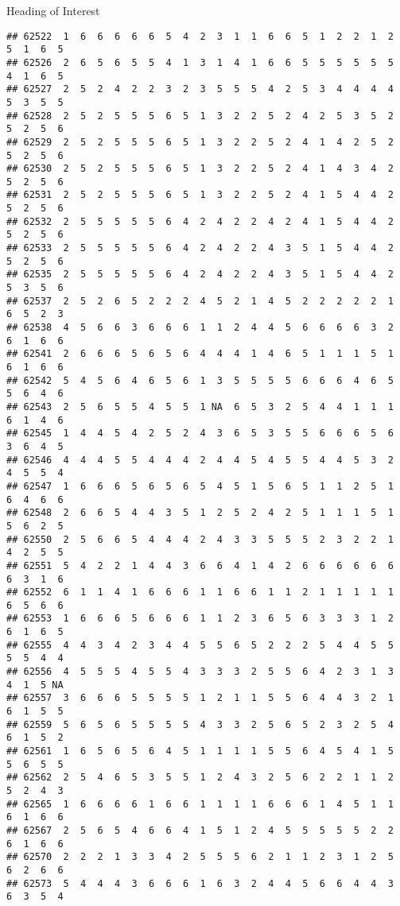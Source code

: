 \documentclass[
  ignorenonframetext,
]{beamer}
\begin{document}
\begin{frame}[fragile]{Heading of Interest}
\begin{verbatim}
## 62522  1  6  6  6  6  6  5  4  2  3  1  1  6  6  5  1  2  2  1  2  5  1  6  5
## 62526  2  6  5  6  5  5  4  1  3  1  4  1  6  6  5  5  5  5  5  5  4  1  6  5
## 62527  2  5  2  4  2  2  3  2  3  5  5  5  4  2  5  3  4  4  4  4  5  3  5  5
## 62528  2  5  2  5  5  5  6  5  1  3  2  2  5  2  4  2  5  3  5  2  5  2  5  6
## 62529  2  5  2  5  5  5  6  5  1  3  2  2  5  2  4  1  4  2  5  2  5  2  5  6
## 62530  2  5  2  5  5  5  6  5  1  3  2  2  5  2  4  1  4  3  4  2  5  2  5  6
## 62531  2  5  2  5  5  5  6  5  1  3  2  2  5  2  4  1  5  4  4  2  5  2  5  6
## 62532  2  5  5  5  5  5  6  4  2  4  2  2  4  2  4  1  5  4  4  2  5  2  5  6
## 62533  2  5  5  5  5  5  6  4  2  4  2  2  4  3  5  1  5  4  4  2  5  2  5  6
## 62535  2  5  5  5  5  5  6  4  2  4  2  2  4  3  5  1  5  4  4  2  5  3  5  6
## 62537  2  5  2  6  5  2  2  2  4  5  2  1  4  5  2  2  2  2  2  1  6  5  2  3
## 62538  4  5  6  6  3  6  6  6  1  1  2  4  4  5  6  6  6  6  3  2  6  1  6  6
## 62541  2  6  6  6  5  6  5  6  4  4  4  1  4  6  5  1  1  1  5  1  6  1  6  6
## 62542  5  4  5  6  4  6  5  6  1  3  5  5  5  5  6  6  6  4  6  5  5  6  4  6
## 62543  2  5  6  5  5  4  5  5  1 NA  6  5  3  2  5  4  4  1  1  1  6  1  4  6
## 62545  1  4  4  5  4  2  5  2  4  3  6  5  3  5  5  6  6  6  5  6  3  6  4  5
## 62546  4  4  4  5  5  4  4  4  2  4  4  5  4  5  5  4  4  5  3  2  4  5  5  4
## 62547  1  6  6  6  5  6  5  6  5  4  5  1  5  6  5  1  1  2  5  1  6  4  6  6
## 62548  2  6  6  5  4  4  3  5  1  2  5  2  4  2  5  1  1  1  5  1  5  6  2  5
## 62550  2  5  6  6  5  4  4  4  2  4  3  3  5  5  5  2  3  2  2  1  4  2  5  5
## 62551  5  4  2  2  1  4  4  3  6  6  4  1  4  2  6  6  6  6  6  6  6  3  1  6
## 62552  6  1  1  4  1  6  6  6  1  1  6  6  1  1  2  1  1  1  1  1  6  5  6  6
## 62553  1  6  6  6  5  6  6  6  1  1  2  3  6  5  6  3  3  3  1  2  6  1  6  5
## 62555  4  4  3  4  2  3  4  4  5  5  6  5  2  2  2  5  4  4  5  5  5  5  4  4
## 62556  4  5  5  5  4  5  5  4  3  3  3  2  5  5  6  4  2  3  1  3  4  1  5 NA
## 62557  3  6  6  6  5  5  5  5  1  2  1  1  5  5  6  4  4  3  2  1  6  1  5  5
## 62559  5  6  5  6  5  5  5  5  4  3  3  2  5  6  5  2  3  2  5  4  6  1  5  2
## 62561  1  6  5  6  5  6  4  5  1  1  1  1  5  5  6  4  5  4  1  5  5  6  5  5
## 62562  2  5  4  6  5  3  5  5  1  2  4  3  2  5  6  2  2  1  1  2  5  2  4  3
## 62565  1  6  6  6  6  1  6  6  1  1  1  1  6  6  6  1  4  5  1  1  6  1  6  6
## 62567  2  5  6  5  4  6  6  4  1  5  1  2  4  5  5  5  5  5  2  2  6  1  6  6
## 62570  2  2  2  1  3  3  4  2  5  5  5  6  2  1  1  2  3  1  2  5  6  2  6  6
## 62573  5  4  4  4  3  6  6  6  1  6  3  2  4  4  5  6  6  4  4  3  6  3  5  4

\end{verbatim}
\end{frame}
\end{document}
